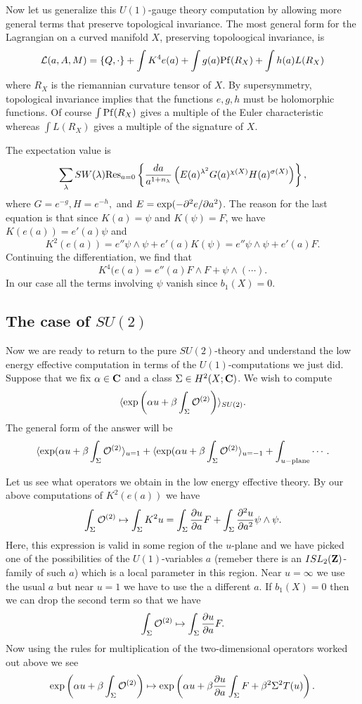 \documentclass[10pt]{article}
\begin{document}
Now let us generalize this $U(1)$-gauge theory computation by allowing
more general terms that 
preserve topological invariance.
The most general form for the Lagrangian on a
curved manifold $X$, preserving topoloogical invariance, is
$${\cal L}(a,A,M)=\{Q,\cdot\}+\int K^4e(a)+\int g(a){\rm Pf}(R_X)+\int
h(a)L(R_X)$$ 
where $R_X$ is the riemannian curvature tensor of $X$.
By supersymmetry, topological invariance implies that the functions
$e,g,h$ must be holomorphic functions.  Of 
course $\int{\rm Pf}(R_X)$ gives a multiple of the Euler
characteristic whereas $\int L(R_X)$ gives a multiple of
the signature of $X$. 

The expectation value is
$$\sum_\lambda SW(\lambda) {\rm
Res}_{a=0}\left\{\frac{da}{a^{1+n_\lambda}}\left(E(a)^{\lambda^2}
G(a)^{\chi(X)}H(a)^{\sigma(X)}\right)\right\},$$ 
where $G=e^{-g}, H=e^{-h},$ and $E={\rm exp}(-\partial^2e/\partial
a^2)$. 
The reason for the last equation is that since $K(a)=\psi$ and
$K(\psi)=F$, we have
$K(e(a))=e'(a)\psi$ and 
$$K^2(e(a))=e''\psi\wedge \psi+e'(a)K(\psi)=e''\psi\wedge \psi+e'(a)F.$$
Continuing the differentiation, we find that
$$K^4(e(a)=e''(a)F\wedge F+\psi\wedge (\cdots ).$$
In our case all the terms involving $\psi$ vanish since $b_1(X)=0$. 





\subsection{The case of $SU(2)$}

Now we are ready to return to the pure $SU(2)$-theory and understand the
low energy effective computation in terms of the $U(1)$-computations
we just did. Suppose that we fix $\alpha\in {\bf C}$ and a class
$\Sigma\in H^2(X;{\bf C})$.
We wish to compute
$$\langle {\rm exp}\left(\alpha u+\beta\int_{\Sigma}{\cal
O}^{(2)}\right)\rangle_{SU(2)}.$$ 
The general form of the answer will be
$$\langle {\rm exp}(\alpha u+\beta\int_\Sigma{\cal O}^{(2)}\rangle_{u=1}+
\langle {\rm exp}(\alpha u+\beta\int_\Sigma{\cal
O}^{(2)}\rangle_{u=-1}+\int_{u-{\rm plane}}\cdots .$$

Let us see what operators we obtain in the low energy effective
theory.
By our above computations of $K^2(e(a))$ we have
$$\int_\Sigma{\cal O}^{(2)}\mapsto \int_\Sigma K^2u=\int_\Sigma
\frac{\partial u}{\partial a} F+\int_\Sigma\frac{\partial^2 u}{\partial
a^2}\psi\wedge\psi.$$ 
Here, this expression is valid in some region of the $u$-plane and we
have picked one of the possibilities of the $U(1)$-variables  $a$ (remeber
there is an $ISL_2({\bf Z})$-family of such $a$) which is a local
parameter in this region. Near $u=\infty$ we use the usual $a$ but
near $u=1$ we have to use the a different $a$.
If $b_1(X)=0$ then we can drop the second term so that we have
$$\int_\Sigma{\cal O}^{(2)}\mapsto \int_\Sigma
\frac{\partial u}{\partial a} F.$$
Now using the rules for multiplication of the two-dimensional
operators worked out above we see
$${\rm exp}\left(\alpha u+\beta\int_\Sigma{\cal O}^{(2)}\right)\mapsto {\rm
exp}\left(\alpha u+\beta\frac{\partial u}{\partial a} \int_\Sigma
F+\beta^2\Sigma^2T(u)\right).$$ 
\end{document}
